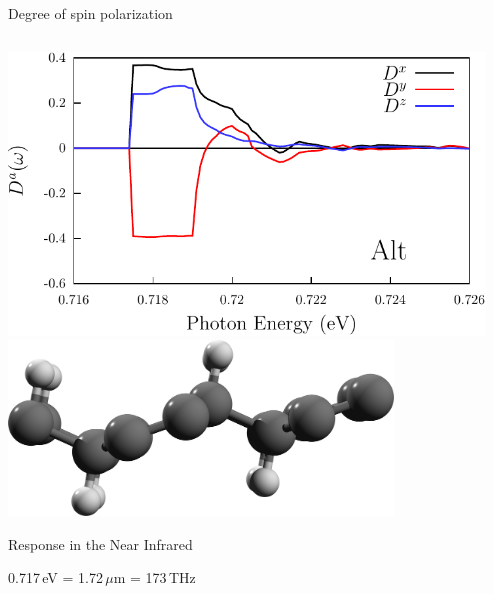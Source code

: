 \documentclass{beamer}
\begin{document}
\begin{frame}

\begin{center}
{\Large Degree of spin polarization}
\end{center}

\begin{columns}

\begin{center}
\small

\includegraphics[width=0.99\textwidth]{figs/plots/dsp-alt.pdf}
\vspace{3mm}
\includegraphics[width=0.8\textwidth]{figs/alt2.png}

Response in the Near Infrared

0.717\,eV = 1.72\,$\mu$m = 173\,THz

\end{center}



\begin{center}
\small 


\end{center}
\end{columns}
\end{frame}
\end{document}
